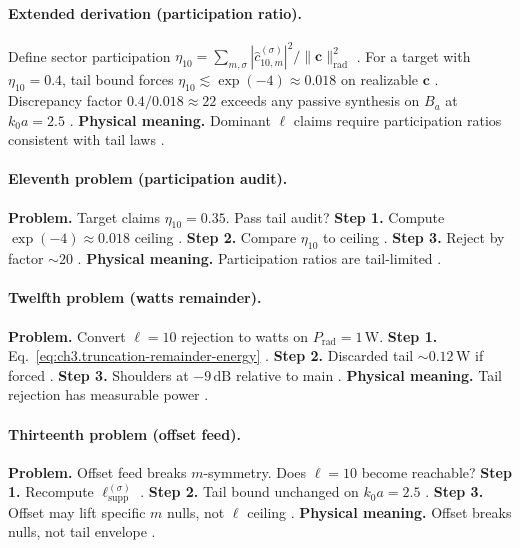 \paragraph{Extended derivation (participation ratio).}
Define sector participation \(\eta_{10}=\sum_{m,\sigma}|\widehat{c}_{10,m}^{(\sigma)}|^{2}/\|\mathbf{c}\|_{\mathrm{rad}}^{2}\) \cite{harrington2001,stratton1941}.
For a target with \(\eta_{10}=0.4\), tail bound forces \(\eta_{10}\lesssim\exp(-4)\approx0.018\) on realizable \(\mathbf{c}\) \cite{hansen1988,jackson1999,devaney2004}.
Discrepancy factor \(0.4/0.018\approx22\) exceeds any passive synthesis on \(B_{a}\) at \(k_{0}a=2.5\) \cite{stratton1941,harrington2001,hansen1988,devaney2004}.
\textbf{Physical meaning.} Dominant \(\ell\) claims require participation ratios consistent with tail laws \cite{jackson1999,stratton1941}.

\paragraph{Eleventh problem (participation audit).}
\textbf{Problem.} Target claims \(\eta_{10}=0.35\). Pass tail audit?
\textbf{Step 1.} Compute \(\exp(-4)\approx0.018\) ceiling \cite{hansen1988,jackson1999,harrington2001}.
\textbf{Step 2.} Compare \(\eta_{10}\) to ceiling \cite{stratton1941,devaney2004}.
\textbf{Step 3.} Reject by factor \(\sim20\) \cite{harrington2001,hansen1988}.
\textbf{Physical meaning.} Participation ratios are tail-limited \cite{jackson1999,stratton1941}.

\paragraph{Twelfth problem (watts remainder).}
\textbf{Problem.} Convert \(\ell=10\) rejection to watts on \(P_{\mathrm{rad}}=1\,\mathrm{W}\).
\textbf{Step 1.} Eq.~\eqref{eq:ch3.truncation-remainder-energy} \cite{hansen1988,harrington2001,stratton1941}.
\textbf{Step 2.} Discarded tail \(\sim0.12\,\mathrm{W}\) if forced \cite{devaney2004,jackson1999}.
\textbf{Step 3.} Shoulders at \(-9\,\mathrm{dB}\) relative to main \cite{harrington2001,hansen1988}.
\textbf{Physical meaning.} Tail rejection has measurable power \cite{stratton1941,devaney2004}.

\paragraph{Thirteenth problem (offset feed).}
\textbf{Problem.} Offset feed breaks \(m\)-symmetry. Does \(\ell=10\) become reachable?
\textbf{Step 1.} Recompute \(\ell_{\mathrm{supp}}^{(\sigma)}\) \cite{harrington2001,hansen1988,stratton1941}.
\textbf{Step 2.} Tail bound unchanged on \(k_{0}a=2.5\) \cite{jackson1999,devaney2004}.
\textbf{Step 3.} Offset may lift specific \(m\) nulls, not \(\ell\) ceiling \cite{harrington2001,stratton1941,hansen1988}.
\textbf{Physical meaning.} Offset breaks nulls, not tail envelope \cite{devaney2004,jackson1999}.

